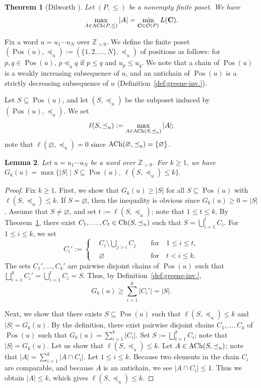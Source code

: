 \documentclass[reqno]{amsart}
\newtheorem{theorem}{Theorem}[section]
\newtheorem{lemma}[theorem]{Lemma}
\theoremstyle{definition}
\theoremstyle{remark}
\numberwithin{equation}{section}
\begin{document}
	\begin{theorem}[Dilworth {\cite{dilworth1950}}]\label{thm:dilworth}
		Let $(P,\le)$ be a nonempty finite poset.
		We have 
		\[
		\max_{A\in \operatorname{ACh}(P,\le)}|A|=\min_{\mathbf{C}\in \mathcal{O}(P)}L(\mathbf{C}).
		\]
	\end{theorem}
	
	Fix a word $u=u_1\cdots u_N$ over $\mathbb{Z}_{>0}$.
	We define the finite poset $(\operatorname{Pos}(u),\preceq_u):=(\{1,2,\dots,N\},\preceq_u)$ of positions as follows:
	for $p,q\in \operatorname{Pos}(u)$, 
	$p\preceq_u q$ if $p\le q$ and $u_p\le u_q$.
	We note that a chain of $\operatorname{Pos}(u)$ is a weakly increasing subsequence of $u$,
	and an antichain of $\operatorname{Pos}(u)$ is a strictly decreasing subsequence of $u$
	(Definition~\ref{def:greene-inv.}).
	
	Let $S\subseteq\operatorname{Pos}(u)$,
	and let $(S,\preceq_u)$ be the subposet induced by $(\operatorname{Pos}(u),\preceq_u)$.
	We set 
	$$\ell(S,\preceq_u):=\max_{A\in\operatorname{ACh}(S,\preceq_u)}|A|;$$
	note that 
	$\ell(\varnothing,\preceq_u)=0$ since $\operatorname{ACh}(\varnothing,\preceq_u)=\{\varnothing\}$.
	
	\begin{lemma}\label{lem:tworow}
		Let $u=u_1\cdots u_N$ be a word over $\mathbb{Z}_{>0}$.
		For $k\ge1$, we have
		$G_k(u)=\max\{|S|\mid S\subseteq\operatorname{Pos}(u),\ \ell(S,\preceq_u)\le k\}.$
	\end{lemma}
	
	
	\begin{proof}
		Fix $k\ge1$.
		First, we show that $G_k(u)\ge|S|$ for all $S\subseteq\operatorname{Pos}(u)$ with
		$\ell(S,\preceq_u)\le k$.
		If $S=\varnothing$, then the inequality is obvious since $G_k(u)\ge0=|S|$.
		Assume that $S\ne\varnothing$, and set $t:=\ell(S,\preceq_u)$;
		note that $1\le t\le k$.
		By Theorem~\ref{thm:dilworth},
		there exist $C_1,\dots,C_t\in \operatorname{Ch}(S,\preceq_u)$ such that $S=\bigcup_{i=1}^t C_i$.
		For $1\le i\le k$, we set
		$$
		C_i':=\left\{
		\begin{aligned}
			&C_i\setminus\bigcup_{j>i}C_j\;
			\quad &\text{for}\quad 1\le i\le t,  \\
			&\varnothing\;
			\quad  &\text{for}\quad t<i\le k.
		\end{aligned}
		\right.
		$$
		The sets $C_1',\dots,C_k'$ are pairwise disjoint chains of $\operatorname{Pos}(u)$ such that $\bigsqcup_{i=1}^k{C_i'}=\bigcup_{i=1}^t C_i=S$.
		Thus, by Definition~\ref{def:greene-inv.},
		\[
		G_k(u)\ge\sum_{i=1}^k|C_i'|=|S|.
		\]
		
		Next, we show that there exists $S\subseteq\operatorname{Pos}(u)$ such that $\ell(S,\preceq_u)\le k$ and
		$|S|=G_k(u)$.
		By the definition, there exist pairwise
		disjoint chains $C_1,\dots,C_k$ of $\operatorname{Pos}(u)$ such that $G_k(u)=\sum_{i=1}^k|C_i|$.
		Set $S:=\bigsqcup_{i=1}^kC_i$; 
		note that $|S|=G_k(u)$.
		Let us show that $\ell(S,\preceq_u)\le k$.
		Let $A\in \operatorname{ACh}(S,\preceq_u)$;
		note that $|A|=\sum_{i=1}^k |A\cap C_i|$.
		Let $1\le i\le k$.
		Because two elements in the chain $C_i$ are comparable, 
		and because $A$ is an antichain,
		we see $|A\cap C_i|\le 1$.
		Thus we obtain $|A|\le k$,
		which gives $\ell(S,\preceq_u)\le k$.
	\end{proof}
	
\end{document}

